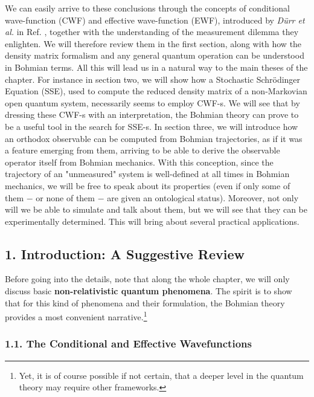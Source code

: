 \documentclass[11pt, a4paper]{article} %
\begin{document}
We can easily arrive to these conclusions through the concepts of conditional wave-function (CWF) and effective wave-function (EWF), introduced by {\em Dürr et al.} in Ref. \cite{Absolute}, together with the understanding of the measurement dilemma they enlighten. We will therefore review them in the first section, along with how the density matrix formalism and any general quantum operation can be understood in Bohmian terms. All this will lead us in a natural way to the main theses of the chapter. For instance in section two, we will show how a Stochastic Schrödinger Equation (SSE), used to compute the reduced density matrix of a non-Markovian open quantum system, necessarily seems to employ CWF-s. We will see that by dressing these CWF-s with an interpretation, the Bohmian theory can prove to be a useful tool in the search for SSE-s. In section three, we will introduce how an orthodox observable can be computed from Bohmian trajectories, as if it was a feature emerging from them, arriving to be able to derive the observable operator itself from Bohmian mechanics. With this conception, since the trajectory of an "unmeasured" system is well-defined at all times in Bohmian mechanics, we will be free to speak about its properties (even if only some of them $-$ or none of them $-$ are given an ontological status). Moreover, not only will we be able to simulate and talk about them, but we will see that they can be experimentally determined. This will bring about several practical applications.


\subsection*{1. Introduction: A Suggestive Review}
\vspace{-0.2cm}

Before going into the details, note that along the whole chapter, we will only discuss basic {\bf non-relativistic quantum phenomena}. The spirit is to show that for this kind of phenomena and their formulation, the Bohmian theory provides a most convenient narrative.\footnote{Yet, it is of course possible if not certain, that a deeper level in the quantum theory may require other frameworks.}\vspace{-0.3cm}

\subsubsection*{1.1. The Conditional and Effective Wavefunctions}
\vspace{-0.2cm}
\end{document}
